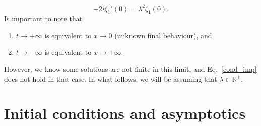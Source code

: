 \documentclass[
 aip,
 jmp,
 amsmath,amssymb,
 reprint,
 nofootinbib,
]{revtex4-2}
\begin{document}
\begin{equation}\label{cond_imp}
-2i \zeta_1'(0) = \lambda^2 \zeta_1(0).%
\end{equation}
Is important to note that 
\begin{enumerate}
\item[(a)]  $t\to+\infty$ is equivalent to $x\to 0$ (unknown final behaviour), and

\item[(b)]  $t\to-\infty$ is equivalent to $x\to +\infty$.
\end{enumerate}
However, we know some solutions are not finite in this limit, and Eq.~\eqref{cond_imp} does not hold in that case. In what follows, we will be assuming that  $\lambda \in \mathbb{R}^+$. 


\section{\label{sec:Condiciones iniciales}Initial conditions and asymptotics}
\end{document}
